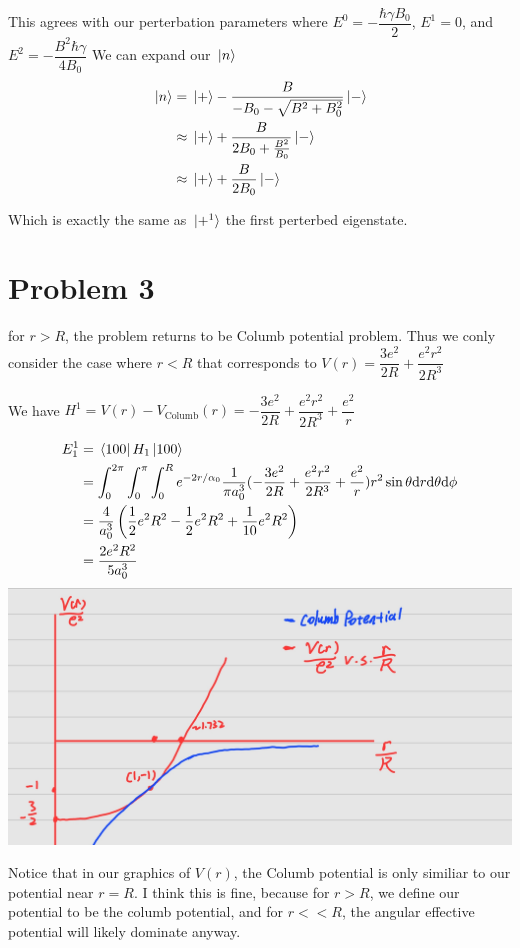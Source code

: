 \documentclass[10pt]{article}
\begin{document}
This agrees with our perterbation parameters where $E^ 0 = -\dfrac{\hbar \gamma B_0}{2}$, $E^1 = 0$, and $E^2 = -\dfrac{B^2 \hbar \gamma}{4B_0}$
We can expand our $\ket*{n}$
\begin{align*}
    \ket*{n} &= \ket*{+} - \dfrac{B}{-B_0 - \sqrt{B^2 + B_0^2}} \ket*{-} \\
    &\approx \ket*{+}+ \dfrac{B}{2B_0 + \frac{B^2}{B_0}} \ket*{-} \\
    &\approx \ket*{+} + \dfrac{B}{2B_0}\ket*{-}
\end{align*}

Which is exactly the same as $\ket*{+^1}$ the first perterbed eigenstate.

\section*{Problem 3}
for $r> R$, the problem returns to be Columb potential problem. Thus we conly consider the case where $r<R$ that corresponds to    
$V(r) = \dfrac{3e^2}{2R} + \dfrac{e^2 r^2}{2R^3}$

We have $H^1 = V(r) - V_{\text{Columb}}(r) = -\dfrac{3e^2}{2R} + \dfrac{e^2 r^2}{2R^3} + \dfrac{e^2}{r}$

\begin{align*}
    E^1_1 &= \bra*{100} H_1 \ket*{100}\\
    &= \int_0 ^{2 \pi}\int_0 ^\pi \int_0^R e^{-2r/\alpha_0} \dfrac{1}{\pi a_0^3} (-\dfrac{3e^2}{2R} + \dfrac{e^2 r^2}{2R^3} + \dfrac{e^2}{r}) r^2 \sin{\theta} \dd r \dd \theta \dd \phi \\
    &= \frac{4}{a_0^3}\left(\dfrac{1}{2} e^2 R^2 - \dfrac{1}{2} e^2 R^2 + \dfrac{1}{10} e^2 R^2\right) \\
    &= \dfrac{2e^2R^2}{5a_0^3}
 \end{align*}
 \includegraphics[scale=0.2]{picture} 

 Notice that in our graphics of $V(r)$, the Columb potential is only similiar to our potential near $r=R$. I think this is fine, because for $r>R$, we define our potential to be the columb potential, and for $r<<R$, the angular effective potential will likely dominate anyway. \\
 
\end{document}
